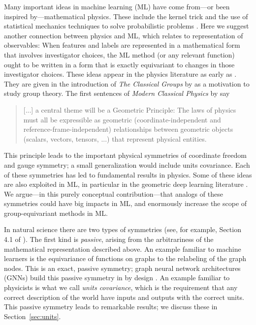 \documentclass{article}
\theoremstyle{plain}
\theoremstyle{definition}
\theoremstyle{remark}
\newcommand{\sectionname}{Section}
\newcommand{\secref}[1]{\sectionname~\ref{#1}}
\begin{document}
Many important ideas in machine learning (ML) have come from---or been inspired by---mathematical physics.
These include the kernel trick \cite{CouHil53,SchSmo02} and the use of statistical mechanics techniques to solve probabilistic problems \cite{mcmc, gibbs}.
Here we suggest another connection between physics and ML, which relates to representation of observables:
When features and labels are represented in a mathematical form that involves investigator choices, the ML method (or any relevant function) ought to be written in a form that is exactly equivariant to changes in those investigator choices.
These ideas appear in the physics literature as early as \citet{gr}. They are given in the introduction of \textit{The Classical Groups} by \citet{weyl} as a motivation to study group theory.
The first sentences of \textit{Modern Classical Physics} by \citet{mcp} say
\vspace{-1ex}\begin{quote}
[...] a central theme will be a Geometric Principle: 
The laws of physics must all
be expressible as geometric (coordinate-independent and reference-frame-independent)
relationships between geometric objects (scalars, vectors, tensors, ...) that represent
physical entities.
\end{quote}\vspace{-1ex}
This principle leads to the important physical symmetries of coordinate freedom and gauge symmetry; a small generalization would include units covariance.
Each of these symmetries has led to fundamental results in physics. Some of these ideas are also exploited in ML, in particular in the geometric deep learning literature \cite{bronstein2021geometric}. 
We argue---in this purely conceptual contribution---that analogs of these symmetries could have big impacts in ML, and enormously increase the scope of group-equivariant methods in ML.

In natural science there are two types of symmetries (see, for example, Section 4.1 of \citealt{rovelli2000loop}). 
The first kind is \emph{passive}, arising from the arbitrariness of the mathematical representation described above.
An example familiar to machine learners is the equivariance of functions on graphs to the relabeling of the graph nodes.
This is an exact, passive symmetry; graph neural network architectures (GNNs) build this passive symmetry in by design \cite{bruna2013spectral, duvenaud2015convolutional, gilmer2017neural}. 
An example familiar to physicists is what we call \emph{units covariance}, which is the requirement that any correct description of the world have inputs and outputs with the correct units.
This passive symmetry leads to remarkable results; we discuss these in \secref{sec:units}.
\end{document}
